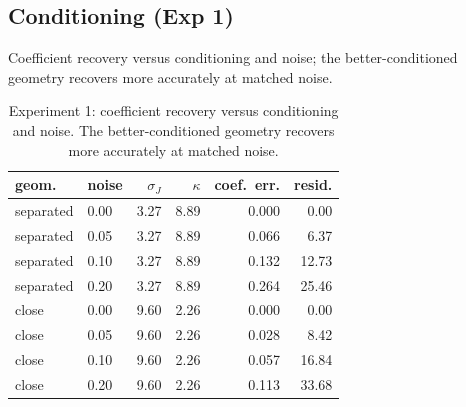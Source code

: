 \subsection{Conditioning (Exp 1)}
Coefficient recovery versus conditioning and noise; the better-conditioned geometry
recovers more accurately at matched noise.
\begin{table}[t]
\centering
\footnotesize
\caption{Experiment 1: coefficient recovery versus conditioning and noise. The
better-conditioned geometry recovers more accurately at matched noise.}
\label{tab:results_h1}
\begin{tabular}{llrrrr}
\toprule
geom. & noise & $\sigma_J$ & $\kappa$ & coef.\ err. & resid. \\
\midrule
separated & 0.00 & 3.27 & 8.89 & 0.000 & 0.00 \\
separated & 0.05 & 3.27 & 8.89 & 0.066 & 6.37 \\
separated & 0.10 & 3.27 & 8.89 & 0.132 & 12.73 \\
separated & 0.20 & 3.27 & 8.89 & 0.264 & 25.46 \\
close     & 0.00 & 9.60 & 2.26 & 0.000 & 0.00 \\
close     & 0.05 & 9.60 & 2.26 & 0.028 & 8.42 \\
close     & 0.10 & 9.60 & 2.26 & 0.057 & 16.84 \\
close     & 0.20 & 9.60 & 2.26 & 0.113 & 33.68 \\
\bottomrule
\end{tabular}
\end{table}

